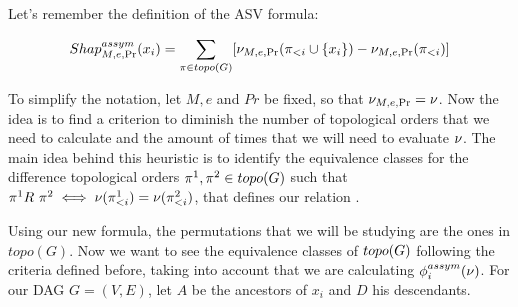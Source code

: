 
Let's remember the definition of the  ASV formula:

\begin{align*}
    Shap^{assym}_{M,e,\Pr}(x_i) = \sum_{\pi \in topo(G)} [\nu_{M,e,\Pr}(\pi_{<i} \cup \{x_i\}) - \nu_{M,e,\Pr}(\pi_{<i})] 
\end{align*}


To simplify the notation, let $M,e$ and $Pr$ be fixed, so that $\nu_{M,e,\Pr} = \nu$. Now the idea is to find a criterion to diminish the number of topological orders that we need to calculate and the amount of times that we will need to evaluate $\nu$. The main idea behind this heuristic is to identify the equivalence classes for the difference topological orders $\pi^1, \pi^2 \in topo(G)$ such that $\pi^1 R \ \pi^2 \iff \nu(\pi^1_{<i}) = \nu(\pi^2_{<i}) $, that defines our relation \rel. 

Using our new formula, the permutations that we will be studying are the ones in $topo(G)$. Now we want to see the equivalence classes of $topo(G)$ following the criteria defined before, taking into account that we are calculating $\phi_{i}^{assym}(\nu)$. For our DAG $G=(V,E)$, let $A$ be the ancestors of $x_i$ and $D$ his descendants.


